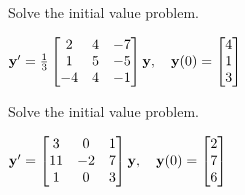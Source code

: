 \documentclass{ximera}
\begin{document}
\begin{problem}\label{exer:10.4.23}
Solve the initial value problem.

$ {\bf y}'=\frac{1}{3} \begin{bmatrix}2&4&-7\\1&5&-5\\-4&4&-1\end{bmatrix}{\bf
y},\quad{\bf y}(0)= \begin{bmatrix}4\\1\\3\end{bmatrix}$
\end{problem}

\begin{problem}\label{exer:10.4.24} 
Solve the initial value problem.

$ {\bf y}'= \begin{bmatrix}3&0&1\\11&-2&7\\1&0&3\end{bmatrix}{\bf y},\quad
{\bf y}(0)= \begin{bmatrix}2\\7\\6\end{bmatrix}$


\end{problem}
\end{document}

